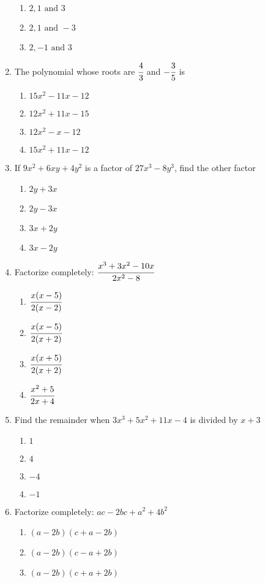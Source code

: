 \begin{multicols}{2}
\begin{enumerate}[label={\arabic*.}]
\begin{enumerate}[label={\Alph*.}]
	\item \(2, 1 \text{ and } 3\)
	\item \(2, 1 \text{ and } -3\)
	\item \(2, -1 \text{ and } 3\)
	\end{enumerate}
\item The polynomial whose roots are \(\cfrac{4}{3}\) and \(-{\cfrac{3}{5}}\) is
	\begin{enumerate}[label={\Alph*.}]
	\item \(15x^2 - 11x -12 \)
	\item \(12x^2 + 11x -15\)
	\item \(12x^2 - x -12\)
	\item \(15x^2 + 11x -12\)
	\end{enumerate}
\item If \(9x^2 + 6xy + 4y^2\) is a factor of \(27x^3 - 8y^3\), find the other factor
	\begin{enumerate}[label={\Alph*.}]
	\item \(2y + 3x\)
	\item \(2y - 3x\)
	\item \(3x + 2y\)
	\item \(3x - 2y\)
	\end{enumerate}
\item Factorize completely: \(\cfrac{x^3 + 3x^2 -10x}{2x^2 - 8}\)
	\begin{enumerate}[label={\Alph*.}]
	\item \(\cfrac{x(x-5)}{2(x-2)}\)
	\item \(\cfrac{x(x-5)}{2(x+2)}\)
	\item \(\cfrac{x(x+5)}{2(x+2)}\)
	\item \(\cfrac{x^2 + 5}{2x + 4}\)
	\end{enumerate}
\item Find the remainder when \(3x^3 + 5x^2 + 11x -4\) is divided by \(x+3\)
	\begin{enumerate}[label={\Alph*.}]
	\item \(1\)
	\item \(4\)
	\item \(-4\)
	\item \(-1\)
	\end{enumerate}
\item Factorize completely: \(ac -2bc + a^2 + 4b^2\)
	\begin{enumerate}[label={\Alph*.}]
	\item \((a-2b)(c+a-2b)\)
	\item \((a-2b)(c-a+2b)\)
	\item \((a-2b)(c+a+2b)\)

\end{enumerate}
\end{enumerate}
\end{multicols}
